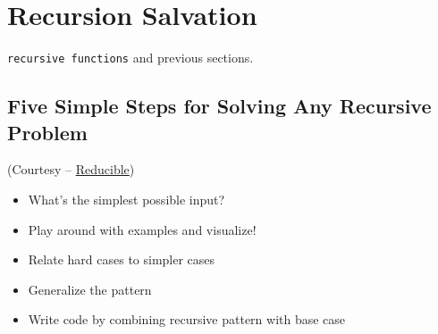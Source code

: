 \documentclass[../../Problems]{subfiles}
\begin{document}
\section{Recursion Salvation}
\begin{topics}
\verb!recursive functions! and previous sections.
\end{topics}
\subsection*{Five Simple Steps for Solving Any Recursive Problem}
(Courtesy -- \href{https://youtu.be/ngCos392W4w}{Reducible})
\begin{itemize}[noitemsep]
	\item What's the simplest possible input?
	\item Play around with examples and visualize!
	\item Relate hard cases to simpler cases
	\item Generalize the pattern
	\item Write code by combining recursive pattern with base case
\end{itemize}





\end{document}

